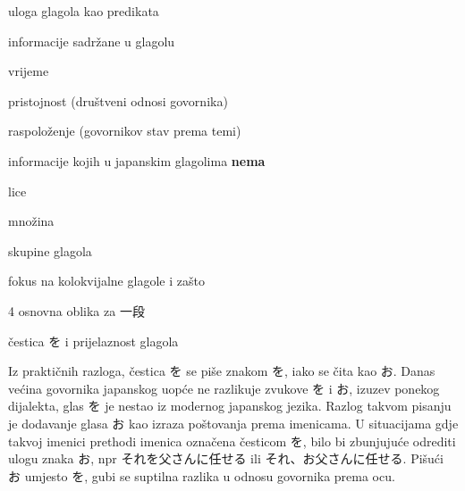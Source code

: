
\author{Tomislav Mamić}

	
	
	\vspace{-10pt}
	\begin{hyou}
		\item uloga glagola kao predikata
		\item informacije sadržane u glagolu
		\vspace{-5pt}
		\begin{hyou}
			\item vrijeme
			\item pristojnost (društveni odnosi govornika)
			\item raspoloženje (govornikov stav prema temi)
		\end{hyou}
		\vspace{-10pt}
		\item informacije kojih u japanskim glagolima \textbf{nema}
		\vspace{-5pt}
		\begin{hyou}
			\item lice
			\item množina
		\end{hyou}
		\vspace{-10pt}
		\item skupine glagola
		\item fokus na kolokvijalne glagole i zašto
		\item 4 osnovna oblika za 一段
		\item čestica を i prijelaznost glagola
	\end{hyou}


	Iz praktičnih razloga, čestica を se piše znakom を, iako se čita kao お. Danas većina govornika japanskog uopće ne razlikuje zvukove を i お, izuzev ponekog dijalekta, glas を je nestao iz modernog japanskog jezika. Razlog takvom pisanju je dodavanje glasa お kao izraza poštovanja prema imenicama. U situacijama gdje takvoj imenici prethodi imenica označena česticom を, bilo bi zbunjujuće odrediti ulogu znaka お, npr それを父さんに任せる ili それ、お父さんに任せる. Pišući お umjesto を, gubi se suptilna razlika u odnosu govornika prema ocu.
	
